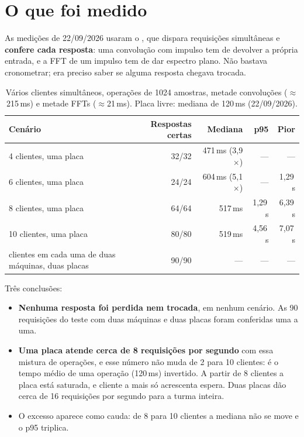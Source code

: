 \section{O que foi medido}

As medições de 22/09/2026 usaram o ,
que dispara requisições simultâneas e \textbf{confere cada resposta}: uma
convolução com impulso tem de devolver a própria entrada, e a FFT de um impulso
tem de dar espectro plano. Não bastava cronometrar; era preciso saber se alguma
resposta chegava trocada.

\begin{table}[htbp]
  \centering
  \small
  \caption{Vários clientes simultâneos, operações de 1024 amostras, metade
    convoluções (\(\approx\)215\,ms) e metade FFTs (\(\approx\)21\,ms). Placa
    livre: mediana de 120\,ms (22/09/2026).}
  \label{tab:concorrencia}
  \begin{tabularx}{\textwidth}{@{}Xrrrr@{}}
    \toprule
    \textbf{Cenário} & \textbf{Respostas certas} & \textbf{Mediana}
      & \textbf{p95} & \textbf{Pior} \\
    \midrule
    4 clientes, uma placa  & 32/32 & 471\,ms (3,9\(\times\)) & --- & --- \\
    6 clientes, uma placa  & 24/24 & 604\,ms (5,1\(\times\)) & --- & 1,29\,s \\
    8 clientes, uma placa  & 64/64 & 517\,ms & 1,29\,s & 6,39\,s \\
    10 clientes, uma placa & 80/80 & 519\,ms & 4,56\,s & 7,07\,s \\
    \addlinespace
    3 clientes em cada uma de duas máquinas, duas placas & 90/90 & --- & --- & --- \\
    \bottomrule
  \end{tabularx}
\end{table}

Três conclusões:

\begin{itemize}
  \item \textbf{Nenhuma resposta foi perdida nem trocada}, em nenhum cenário. As
    90 requisições do teste com duas máquinas e duas placas foram conferidas uma
    a uma.
  \item \textbf{Uma placa atende cerca de 8 requisições por segundo} com essa
    mistura de operações, e esse número não muda de 2 para 10 clientes: é o
    tempo médio de uma operação (120\,ms) invertido. A partir de 8 clientes a
    placa está saturada, e cliente a mais só acrescenta espera. Duas placas dão
    cerca de 16 requisições por segundo para a turma inteira.
  \item O excesso aparece como cauda: de 8 para 10 clientes a mediana não se
    move e o p95 triplica.
\end{itemize}

